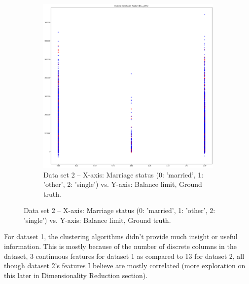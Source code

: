 \documentclass[
letterpaper, %
]{IEEEtran}
\begin{document}
	\begin{figure}[ht]\ContinuedFloat
		\begin{subfigure}{.5\textwidth}
			\centering
			\includegraphics[width=\linewidth]{./images/ds2/clustering/kmeans/gtmarriagelimitbal2.png}
			\caption{Data set 2 -- X-axis: Marriage status (0: 'married', 1: 'other', 2: 'single') vs. Y-axis: Balance limit, Ground truth.}
			\label{fig:gtds2}
		\end{subfigure}
	\end{figure}

	For dataset 1, the clustering algorithms didn't provide much insight or useful information. This is mostly because of the number of discrete columns in the dataset, 3 continuous features for dataset 1 as compared to 13 for dataset 2, all though dataset 2's features I believe are mostly correlated (more exploration on this later in Dimensionality Reduction section).
	
\end{document}
